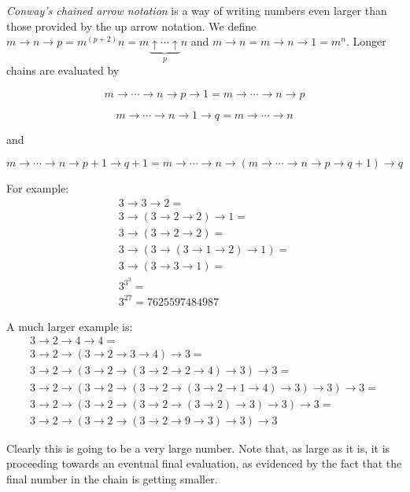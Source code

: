 \documentclass[12pt]{article}
\begin{document}
\emph{Conway's chained arrow notation} is a way of writing numbers even larger than those provided by the up arrow notation.  We define $m\rightarrow n\rightarrow p=m^{(p+2)}n=m\underbrace{\uparrow\cdots\uparrow}_{p}n$ and $m\rightarrow n=m\rightarrow n\rightarrow 1=m^n$.  Longer chains are evaluated by 

$$m\rightarrow\cdots\rightarrow n\rightarrow p\rightarrow 1=
m\rightarrow\cdots\rightarrow n\rightarrow p$$


$$m\rightarrow\cdots\rightarrow n\rightarrow 1\rightarrow q=m\rightarrow\cdots\rightarrow n$$

and

$$m\rightarrow\cdots\rightarrow n\rightarrow p+1\rightarrow q+1=
m\rightarrow\cdots\rightarrow n\rightarrow (m\rightarrow\cdots\rightarrow n\rightarrow p\rightarrow q+1)\rightarrow q$$

For example:
\begin{align*}
3\rightarrow3\rightarrow2 =\\
3\rightarrow(3\rightarrow2\rightarrow2)\rightarrow1 = \\
3\rightarrow(3\rightarrow2\rightarrow2) = \\
3\rightarrow(3\rightarrow(3\rightarrow1\rightarrow2)\rightarrow1) = \\
3\rightarrow(3\rightarrow3\rightarrow1) = \\
3^{3^3} = \\
3^{27} = 
7625597484987
\end{align*}

A much larger example is:
\begin{align*}
3\rightarrow 2\rightarrow 4\rightarrow 4=\\
3\rightarrow 2\rightarrow (3\rightarrow 2\rightarrow 3\rightarrow 4)\rightarrow 3=\\
3\rightarrow 2\rightarrow (3\rightarrow 2\rightarrow (3\rightarrow 2\rightarrow 2\rightarrow 4)\rightarrow 3)\rightarrow 3=\\
3\rightarrow 2\rightarrow (3\rightarrow 2\rightarrow (3\rightarrow 2\rightarrow (3\rightarrow 2\rightarrow 1\rightarrow 4)\rightarrow 3)\rightarrow 3)\rightarrow 3=\\
3\rightarrow 2\rightarrow (3\rightarrow 2\rightarrow (3\rightarrow 2\rightarrow (3\rightarrow 2)\rightarrow 3)\rightarrow 3)\rightarrow 3=\\
3\rightarrow 2\rightarrow (3\rightarrow 2\rightarrow (3\rightarrow 2\rightarrow 9\rightarrow 3)\rightarrow 3)\rightarrow 3
\end{align*}

Clearly this is going to be a very large number.  Note that, as large as it is, it is proceeding towards an eventual final evaluation, as evidenced by the fact that the final number in the chain is getting smaller.
\end{document}
